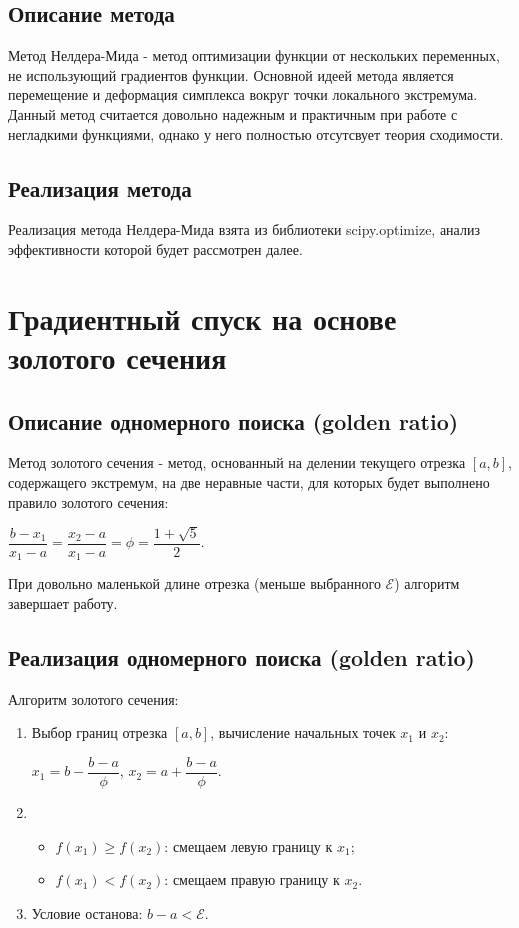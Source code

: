 \documentclass{article}
\begin{document}
\subsection*{Описание метода}
Метод Нелдера-Мида - метод оптимизации функции от нескольких переменных, не использующий градиентов функции. Основной идеей метода является перемещение и деформация симплекса вокруг точки локального экстремума. Данный метод считается довольно надежным и практичным при работе с негладкими функциями, однако у него полностью отсутсвует теория сходимости.
\subsection*{Реализация метода}
Реализация метода Нелдера-Мида взята из библиотеки scipy.optimize, анализ эффективности которой будет рассмотрен далее.
\section*{Градиентный спуск на основе золотого сечения}
\subsection*{Описание одномерного поиска (golden ratio)}
Метод золотого сечения - метод, основанный на делении текущего отрезка $[a, b]$, содержащего экстремум, на две неравные части, для которых будет выполнено правило золотого сечения:
\vspace{.5em}

\noindent $\dfrac{b - x_1}{x_1 - a} = \dfrac{x_2 - a}{x_1 - a} = \phi = \dfrac{1 + \sqrt{5}}{2}.$
\vspace {.5em}

\noindent При довольно маленькой длине отрезка (меньше выбранного $\mathcal{E}$) алгоритм завершает работу.
\subsection*{Реализация одномерного поиска (golden ratio)}
Алгоритм золотого сечения:
\begin{enumerate}
    \item Выбор границ отрезка $[a, b]$, вычисление начальных точек $x_1$ и $x_2$:

    $x_1 = b - \dfrac{b - a}{\phi}$, \; $x_2 = a + \dfrac{b - a}{\phi}$.
    \item \begin{itemize}
        \item $f(x_1) \geq f(x_2)$: смещаем левую границу к $x_1$;
        \item $f(x_1) < f(x_2)$: смещаем правую границу к $x_2$.
    \end{itemize}
    \item Условие останова: $b - a < \mathcal{E}$.
\end{enumerate}
\end{document}
